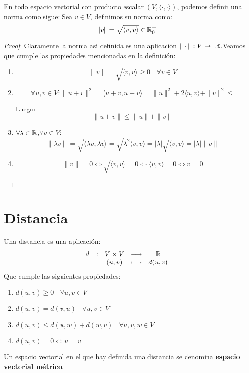 \begin{teo}
    En todo espacio vectorial con producto escalar $(V,\langle \cdot,\cdot \rangle)$, podemos definir una norma como sigue:\newline
    Sea $v \in V$, definimos su norma como:
    $$\|v\| = \sqrt{\langle v, v\rangle} \in \mathbb R_0^{+}$$
\end{teo}
\begin{proof}
    Claramente la norma así definida es una aplicación $\|\cdot\|:V \rightarrow~\mathbb R$.Veamos que cumple las propiedades
    mencionadas en la definición:
    \begin{enumerate}
        \item $$\|v\| = \sqrt{\langle v,v \rangle} \geq 0~~~~\forall v \in V$$
        \item $$\forall u,v \in V: \|u+v\|^2 = \langle u+v, u+v \rangle = \|u\|^2 + 2\langle u,v \rangle + \|v\|^2 \leq$$

        Luego: $$\|u+v\| \leq \|u\|+\|v\|$$
        \item $\forall \lambda \in \mathbb R$,$\forall v \in V$:
    $$\|\lambda v\| = \sqrt{\langle \lambda v,\lambda v \rangle} = \sqrt{\lambda^2 \langle v,v \rangle} = |\lambda| \sqrt{\langle v,v \rangle}
        = |\lambda| \|v\|$$

        \item $$\|v\| = 0 \Leftrightarrow \sqrt{\langle v,v \rangle} = 0 \Leftrightarrow \langle v,v \rangle = 0 \Leftrightarrow v=0$$
    \end{enumerate}
\end{proof}

\section{Distancia}
\begin{definicion}[Distancia]
    Una distancia es una aplicación:
    $$\begin{array}{ccccc}
            d & : & V \times V & \longrightarrow & \mathbb R     \\
              &   & (u,v)      & \longmapsto     & d(u,v)
        \end{array}$$
    Que cumple las siguientes propiedades:
    \begin{enumerate}
        \item $d(u,v) \geq 0~~~~\forall u,v \in V$
        \item $d(u,v) = d(v,u)~~~~\forall u,v \in V$
        \item $d(u,v) \leq d(u,w) + d(w,v)~~~~\forall u,v,w \in V$
        \item $d(u,v)=0 \Leftrightarrow u=v$
    \end{enumerate}
    
    \noindent
    Un espacio vectorial en el que hay definida una distancia se denomina \textbf{espacio vectorial métrico}.
\end{definicion}

